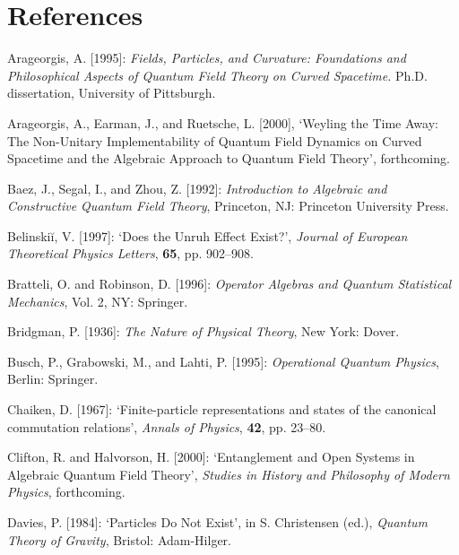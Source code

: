 \documentclass[12pt]{article}
\theoremstyle{remark}
\theoremstyle{definition}
\begin{document}
\section*{References}

\noindent Arageorgis, A. [1995]: \textit{Fields, Particles, and Curvature:
  Foundations and Philosophical Aspects of Quantum Field Theory on
  Curved Spacetime.}  Ph.D. dissertation, University of Pittsburgh.\vspace{.1in}

\noindent Arageorgis, A., Earman, J., and Ruetsche, L. [2000], `Weyling the Time Away:
The Non-Unitary Implementability of Quantum Field Dynamics on Curved
Spacetime and the Algebraic Approach to Quantum Field Theory', 
forthcoming.\vspace{.1in}

\noindent Baez, J., Segal, I., and Zhou, Z. [1992]: {\it Introduction to 
Algebraic and Constructive Quantum Field Theory}, Princeton, NJ: 
Princeton University Press.\vspace{.1in}

\noindent Belinski\u{i}, V. [1997]: `Does the Unruh Effect Exist?', 
{\it Journal of European Theoretical Physics Letters}, {\bf 65}, pp. 
902--908.\vspace{.1in}

\noindent Bratteli, O. and Robinson, D. [1996]: {\it Operator Algebras and
  Quantum Statistical Mechanics}, Vol. 2, NY: Springer.\vspace{.1in}
  
  \noindent Bridgman, P. [1936]: {\it The Nature of Physical Theory}, New 
  York: Dover.\vspace{.1in}
  
  \noindent Busch, P., Grabowski, M., and Lahti, P. [1995]: {\it 
  Operational Quantum Physics}, Berlin: Springer.\vspace{.1in}
  
  \noindent Chaiken, D. [1967]: `Finite-particle representations and states of the
canonical commutation relations', {\it Annals of Physics}, {\bf 42},
pp. 23--80.\vspace{.1in}

\noindent Clifton, R. and Halvorson, H. [2000]: `Entanglement and 
Open Systems in Algebraic Quantum Field Theory', {\it Studies in 
History and Philosophy of Modern Physics}, forthcoming.\vspace{.1in}

\noindent Davies, P. [1984]: `Particles Do Not Exist', in S. Christensen
(ed.), \textit{Quantum Theory of Gravity}, Bristol: 
Adam-Hilger.\vspace{.1in}
\end{document}
